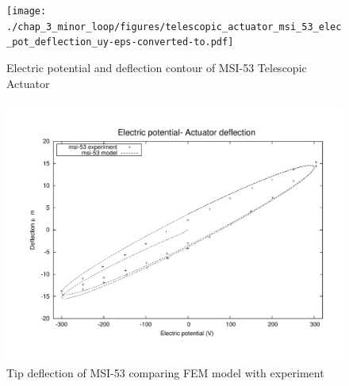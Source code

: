 \begin{figure}
\centering
\texttt{[image: ./chap\_3\_minor\_loop/figures/telescopic\_actuator\_msi\_53\_elec\_pot\_deflection\_uy-eps-converted-to.pdf]}
\caption{Electric potential and deflection contour of MSI-53 Telescopic Actuator}   
\label{fig:MSI_53_XP_contour}  
\end{figure}
 

\begin{figure}
\centering
\includegraphics[width=5.0in]{./chap_3_minor_loop/figures/result_msi-53.pdf}
\caption{Tip deflection of MSI-53 comparing FEM model with experiment}
\label{fig:MSI_53_XP_results}
\end{figure}

